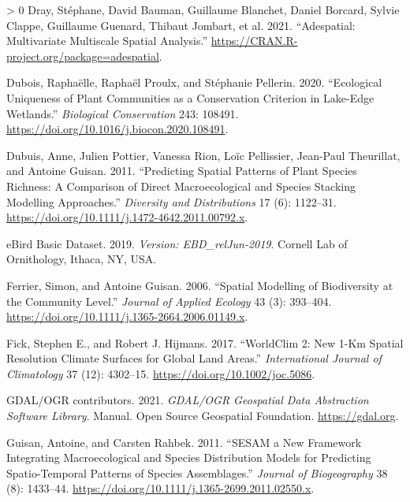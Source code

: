 \documentclass[11pt]{article}
\newlength{\cslhangindent}
\newenvironment{CSLReferences}[3] %
 {%
  \setlength{\parindent}{0pt}
  \ifodd #1 \everypar{\setlength{\hangindent}{\cslhangindent}}\ignorespaces\fi
  \ifnum #2 > 0
  \setlength{\parskip}{#2\baselineskip}
  \fi
 }%
 {}
\begin{document}
\begin{CSLReferences}{1}{0}
\leavevmode\hypertarget{ref-Dray2021AdeMul}{}%
Dray, Stéphane, David Bauman, Guillaume Blanchet, Daniel Borcard, Sylvie
Clappe, Guillaume Guenard, Thibaut Jombart, et al. 2021. {``Adespatial:
Multivariate Multiscale Spatial Analysis.''}
\url{https://CRAN.R-project.org/package=adespatial}.

\leavevmode\hypertarget{ref-Dubois2020EcoUni}{}%
Dubois, Raphaëlle, Raphaël Proulx, and Stéphanie Pellerin. 2020.
{``Ecological Uniqueness of Plant Communities as a Conservation
Criterion in Lake-Edge Wetlands.''} \emph{Biological Conservation} 243:
108491. \url{https://doi.org/10.1016/j.biocon.2020.108491}.

\leavevmode\hypertarget{ref-Dubuis2011PreSpa}{}%
Dubuis, Anne, Julien Pottier, Vanessa Rion, Loïc Pellissier, Jean-Paul
Theurillat, and Antoine Guisan. 2011. {``Predicting Spatial Patterns of
Plant Species Richness: A Comparison of Direct Macroecological and
Species Stacking Modelling Approaches.''} \emph{Diversity and
Distributions} 17 (6): 1122--31.
\url{https://doi.org/10.1111/j.1472-4642.2011.00792.x}.

\leavevmode\hypertarget{ref-eBirdBasicDataset2019VerEbd}{}%
eBird Basic Dataset. 2019. \emph{Version: EBD\_relJun-2019}. Cornell Lab
of Ornithology, Ithaca, NY, USA.

\leavevmode\hypertarget{ref-Ferrier2006SpaMod}{}%
Ferrier, Simon, and Antoine Guisan. 2006. {``Spatial Modelling of
Biodiversity at the Community Level.''} \emph{Journal of Applied
Ecology} 43 (3): 393--404.
\url{https://doi.org/10.1111/j.1365-2664.2006.01149.x}.

\leavevmode\hypertarget{ref-Fick2017Wor2N}{}%
Fick, Stephen E., and Robert J. Hijmans. 2017. {``WorldClim 2: New 1-Km
Spatial Resolution Climate Surfaces for Global Land Areas.''}
\emph{International Journal of Climatology} 37 (12): 4302--15.
\url{https://doi.org/10.1002/joc.5086}.

\leavevmode\hypertarget{ref-GDALux2fOGRcontributors2021GdaOgr}{}%
GDAL/OGR contributors. 2021. \emph{GDAL/OGR Geospatial Data Abstraction
Software Library}. Manual. Open Source Geospatial Foundation.
\url{https://gdal.org}.

\leavevmode\hypertarget{ref-Guisan2011SesNew}{}%
Guisan, Antoine, and Carsten Rahbek. 2011. {``SESAM a New Framework
Integrating Macroecological and Species Distribution Models for
Predicting Spatio-Temporal Patterns of Species Assemblages.''}
\emph{Journal of Biogeography} 38 (8): 1433--44.
\url{https://doi.org/10.1111/j.1365-2699.2011.02550.x}.


\end{CSLReferences}
\end{document}
